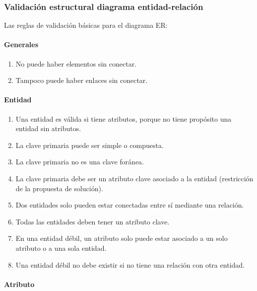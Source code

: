 \subsubsection{Validación estructural diagrama entidad-relación}\label{cap:validationER}

Las reglas de validación básicas para el diagrama ER:

\paragraph*{Generales}
\begin{enumerate}
    \item No puede haber elementos sin conectar.
    \item Tampoco puede haber enlaces sin conectar.
\end{enumerate}


\paragraph*{Entidad}
\begin{enumerate}
    \item Una entidad es válida si tiene atributos, porque no tiene propósito una entidad sin atributos.
    \item La clave primaria puede ser simple o compuesta.
    \item La clave primaria no es una clave foránea.
    \item La clave primaria debe ser un atributo clave asociado a la entidad (restricción de la propuesta de solución).
    \item Dos entidades solo pueden estar conectadas entre sí mediante una relación.
    \item Todas las entidades deben tener un atributo clave.
    \item En una entidad débil, un atributo solo puede estar asociado a un solo atributo o a una sola entidad.
    \item Una entidad débil no debe existir si no tiene una relación con otra entidad.
\end{enumerate}

\paragraph*{Atributo}

